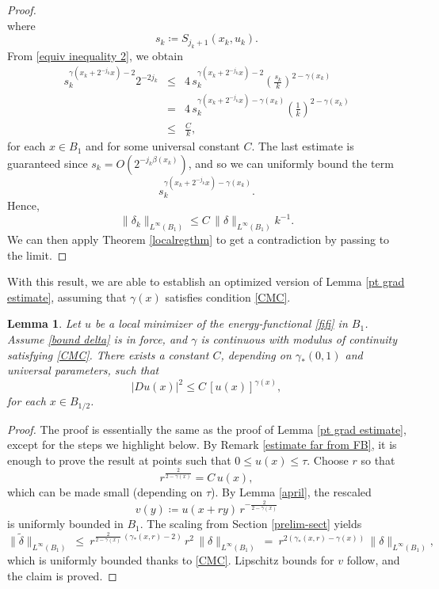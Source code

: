 \documentclass[reqno,11pt]{amsart}
\newtheorem{lemma}{Lemma}[section]
\newcommand{\1}{\mathds{1}}
\numberwithin{equation}{section}
\begin{document}
\begin{proof}
$$$$ 
where
$$
    s_k \coloneqq S_{j_k + 1}(x_k,u_k).
$$
From \eqref{equiv inequality 2}, we obtain
\begin{eqnarray*}
s_k^{\gamma(x_k+2^{-j_k}x)-2}2^{-2j_k} & \leq & 4\, s_k^{\gamma(x_k+2^{-j_k}x)-2} \left( \frac{s_k}{k}\right)^{2-\gamma(x_k)} \\
& = & 4\, s_k^{\gamma(x_k+2^{-j_k}x)-\gamma(x_k)} \left( \frac{1}{k}\right)^{2-\gamma(x_k)}\\
& \leq & \frac{C}{k},
\end{eqnarray*}
for each $x \in B_1$ and for some universal constant $C$. The last estimate is guaranteed since $s_k = O(2^{-j_k \beta(x_k)})$, and so we can uniformly bound the term
$$
    s_k^{\gamma(x_k+2^{-j_k}x)-\gamma(x_k)}.
$$
Hence,
\begin{equation}\nonumber
    \|\delta_k\|_{L^\infty(B_1)} \leq C \, \|\delta\|_{L^\infty(B_1)} k^{-1}.
\end{equation}
We can then apply Theorem \ref{localregthm} to get a contradiction by passing to the limit.
\end{proof}

With this result, we are able to establish an optimized version of Lemma \ref{pt grad estimate}, assuming that $\gamma(x)$ satisfies condition \eqref{CMC}. 

\begin{lemma}\label{opt pt grad estimate} 
Let $u$ be a local minimizer of the energy-functional \eqref{fifi} in $B_1$. Assume \eqref{bound delta} is in force, and $\gamma$ is continuous with modulus of continuity satisfying \eqref{CMC}. There exists a constant $C$, depending on $\gamma_\ast (0,1)$ and universal parameters, such that
\begin{equation}\nonumber
|Du(x)|^2 \le C\, [u(x)]^{\gamma(x)},
\end{equation}
for each $x \in B_{1/2}$.
\end{lemma}

\begin{proof}
The proof is essentially the same as the proof of Lemma \ref{pt grad estimate}, except for the steps we highlight below. By Remark \ref{estimate far from FB}, it is enough to prove the result at points such that $0 \leq u(x) \leq \tau$. 
Choose $r$ so that
$$
  r^{\frac{2}{2-\gamma(x)}} = C\,u(x),
$$
which can be made small (depending on $\tau$). By Lemma \ref{april}, the rescaled
$$
  v(y) \coloneqq u(x+ry)\,r^{-\frac{2}{2-\gamma(x)}}
$$
is uniformly bounded in $B_1$. The scaling from Section \ref{prelim-sect} yields
$$
  \|\tilde{\delta}\|_{L^\infty(B_1)}
  \ \le\ r^{\frac{2}{2-\gamma(x)}\,(\gamma_\ast(x,r)-2)}\,r^2\,\|\delta\|_{L^\infty(B_1)}
  \ =\ r^{2(\gamma_\ast(x,r)-\gamma(x))}\,\|\delta\|_{L^\infty(B_1)},
$$
which is uniformly bounded thanks to \eqref{CMC}. Lipschitz bounds for $v$ follow, and the claim is proved. 
\end{proof}
\end{document}
